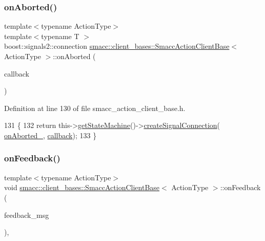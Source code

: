 \subsubsection{\texorpdfstring{on\+Aborted()}{onAborted()}\hspace{0.1cm}{\footnotesize\ttfamily [2/2]}}
{\footnotesize\ttfamily template$<$typename Action\+Type$>$ \\
template$<$typename T $>$ \\
boost\+::signals2\+::connection \hyperlink{classsmacc_1_1client__bases_1_1SmaccActionClientBase}{smacc\+::client\+\_\+bases\+::\+Smacc\+Action\+Client\+Base}$<$ Action\+Type $>$\+::on\+Aborted (\begin{DoxyParamCaption}\item[{std\+::function$<$ void(Result\+Const\+Ptr \&)$>$}]{callback }\end{DoxyParamCaption})\hspace{0.3cm}{\ttfamily [inline]}}



Definition at line 130 of file smacc\+\_\+action\+\_\+client\+\_\+base.\+h.


\begin{DoxyCode}
131     \{
132         \textcolor{keywordflow}{return} this->\hyperlink{classsmacc_1_1ISmaccClient_aec51d4712404cb9882b86e4c854bb93a}{getStateMachine}()->\hyperlink{classsmacc_1_1ISmaccStateMachine_adf0f42ade0c65cc471960fe2a7c42da2}{createSignalConnection}(
      \hyperlink{classsmacc_1_1client__bases_1_1SmaccActionClientBase_adc33748ca4fcef9730f8039b75d496d0}{onAborted\_}, \hyperlink{servers_2opencv__perception__node_2opencv__perception__node_8cpp_a050e697bd654facce10ea3f6549669b3}{callback});
133     \}
\end{DoxyCode}
\mbox{\label{classsmacc_1_1client__bases_1_1SmaccActionClientBase_a5a88fd084076729e9cb864e45338af47}} 
\subsubsection{\texorpdfstring{on\+Feedback()}{onFeedback()}}
{\footnotesize\ttfamily template$<$typename Action\+Type$>$ \\
void \hyperlink{classsmacc_1_1client__bases_1_1SmaccActionClientBase}{smacc\+::client\+\_\+bases\+::\+Smacc\+Action\+Client\+Base}$<$ Action\+Type $>$\+::on\+Feedback (\begin{DoxyParamCaption}\item[{const Feedback\+Const\+Ptr \&}]{feedback\+\_\+msg }\end{DoxyParamCaption})\hspace{0.3cm}{\ttfamily [inline]}, {\ttfamily [protected]}}



